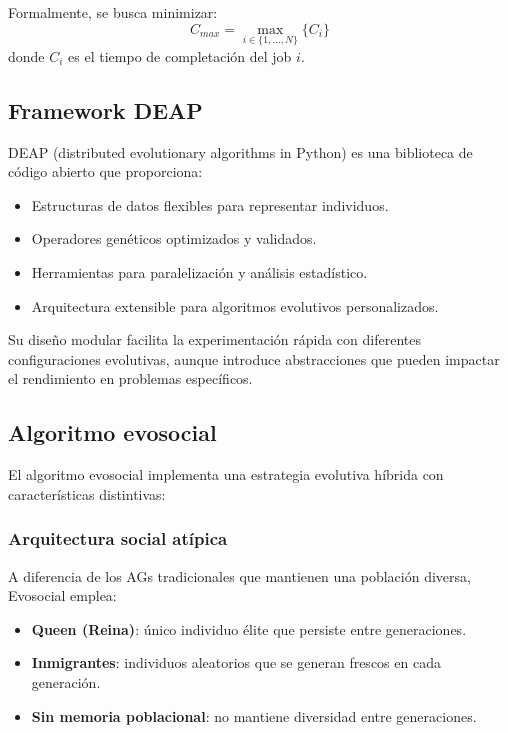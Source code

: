 \documentclass[12pt,a4paper]{article}
\begin{document}
Formalmente, se busca minimizar:
\begin{equation}
C_{max} = \max_{i \in \{1,\ldots,N\}} \{C_i\}
\end{equation}
donde $C_i$ es el tiempo de completación del job $i$.

\subsection{Framework DEAP}

DEAP (distributed evolutionary algorithms in Python) \cite{fortin2012deap} es una biblioteca de código abierto que proporciona:

\begin{itemize}
    \item Estructuras de datos flexibles para representar individuos.
    \item Operadores genéticos optimizados y validados.
    \item Herramientas para paralelización y análisis estadístico.
    \item Arquitectura extensible para algoritmos evolutivos personalizados.
\end{itemize}

Su diseño modular facilita la experimentación rápida con diferentes configuraciones evolutivas, aunque introduce abstracciones que pueden impactar el rendimiento en problemas específicos.

\subsection{Algoritmo evosocial}

El algoritmo evosocial implementa una estrategia evolutiva híbrida con características distintivas:

\subsubsection{Arquitectura social atípica}

A diferencia de los AGs tradicionales que mantienen una población diversa, Evosocial emplea:

\begin{itemize}
    \item \textbf{Queen (Reina)}: único individuo élite que persiste entre generaciones.
    \item \textbf{Inmigrantes}: individuos aleatorios que se generan frescos en cada generación.
    \item \textbf{Sin memoria poblacional}: no mantiene diversidad entre generaciones.
\end{itemize}
\end{document}
